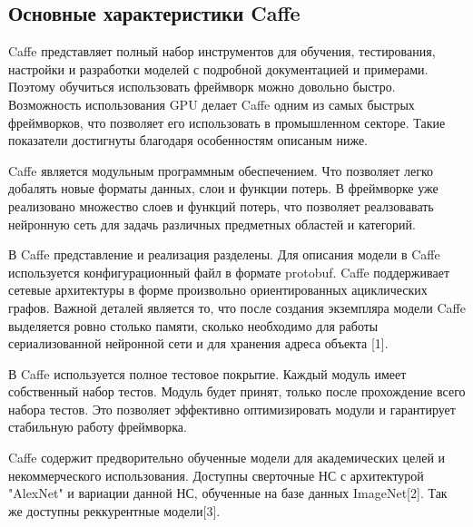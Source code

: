 \documentclass[a4paper,english,russian]{G2-105}
\begin{document}
\subsection{Основные характеристики Caffe}
\par Caffe представляет полный набор инструментов для обучения, тестирования, настройки и разработки моделей с подробной документацией и примерами. Поэтому обучиться использовать фреймворк можно довольно быстро. Возможность использования GPU делает Caffe одним из самых быстрых фреймворков, что позволяет его использовать в промышленном секторе. Такие показатели достигнуты благодаря особенностям описаным ниже.
\par Caffe является модульным программным обеспечением. Что позволяет легко добалять новые форматы данных, слои и функции потерь. В фреймворке уже реализовано множество слоев и функций потерь, что позволяет реалзовавать нейронную сеть для задачь различных предметных областей и категорий.
\par В Caffe представление и реализация разделены. Для описания модели в Caffe используется конфигурационный файл в формате protobuf. Caffe поддерживает сетевые архитектуры в форме произвольно ориентированных ациклических графов. Важной деталей является то, что после создания экземпляра модели Caffe выделяется ровно столько памяти, сколько необходимо для работы сериализованной нейронной сети и для хранения адреса объекта [1].
\par В Caffe используется полное тестовое покрытие. Каждый модуль имеет собственный набор тестов. Модуль будет принят, только после прохождение всего набора тестов. Это позволяет эффективно оптимизировать модули и гарантирует стабильную работу фреймворка.
\par Caffe содержит предворительно обученные модели для академических целей и некоммерческого использования. Доступны сверточные НС с архитектурой "AlexNet" и вариации данной НС, обученные на базе данных ImageNet[2]. Так же доступны реккурентные модели[3].
\ttl
\end{document}
